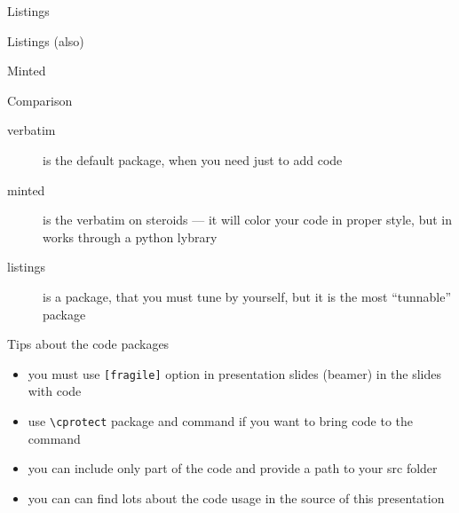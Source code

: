 \begin{frame}[fragile]{Listings\magicPage}\relax

\cprotect{}
\end{frame}

\begin{frame}[fragile]{Listings (also)\magicPage}\relax

\cprotect{}

 
\end{frame}

\begin{frame}[fragile]{Minted\magicPage}\relax

\cprotect{}
\end{frame}

\begin{frame}[fragile]{Comparison\magicPage}\relax
    \begin{description}
         \item[verbatim] is the default package, when you need just to add code 
         \item[minted] is the verbatim on steroids --- it will color your code in proper style, but in works through a python lybrary
         \item[listings] is a package, that you must tune by yourself, but it is the most ``tunnable'' package
    \end{description}
    
\end{frame}

\begin{frame}[fragile]{Tips about the code packages\magicPage}\relax
    \begin{itemize}
         \item you must use {\csk \verb|[fragile]|} option in presentation slides (beamer) in the slides with code 
         \item use {\csk \verb|\cprotect|} package and command if you want to bring code to the command
         \item you can include only part of the code and provide a path to your src folder
         \item you can can find lots about the code usage in the source of this presentation  
    \end{itemize}
\end{frame}

